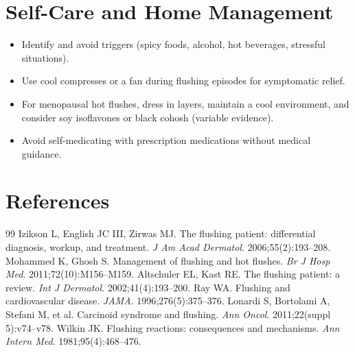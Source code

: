\section*{Self-Care and Home Management}
\begin{itemize}
  \item Identify and avoid triggers (spicy foods, alcohol, hot beverages, stressful situations).
  \item Use cool compresses or a fan during flushing episodes for symptomatic relief.
  \item For menopausal hot flushes, dress in layers, maintain a cool environment, and consider soy isoflavones or black cohosh (variable evidence).
  \item Avoid self-medicating with prescription medications without medical guidance.
\end{itemize}

\section*{References}
\begin{thebibliography}{99}
Izikson L, English JC III, Zirwas MJ. The flushing patient: differential diagnosis, workup, and treatment. \textit{J Am Acad Dermatol}. 2006;55(2):193--208.
Mohammed K, Ghosh S. Management of flushing and hot flushes. \textit{Br J Hosp Med}. 2011;72(10):M156--M159.
Altschuler EL, Kast RE. The flushing patient: a review. \textit{Int J Dermatol}. 2002;41(4):193--200.
Ray WA. Flushing and cardiovascular disease. \textit{JAMA}. 1996;276(5):375--376.
Lonardi S, Bortolami A, Stefani M, et al. Carcinoid syndrome and flushing. \textit{Ann Oncol}. 2011;22(suppl 5):v74--v78.
Wilkin JK. Flushing reactions: consequences and mechanisms. \textit{Ann Intern Med}. 1981;95(4):468--476.
\end{thebibliography}
